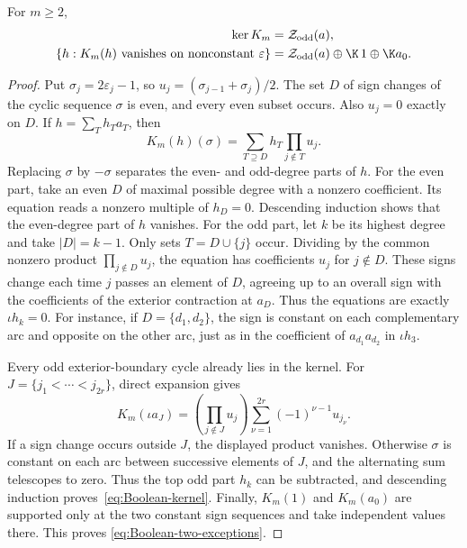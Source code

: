 \begin{lemma}\label{lem:Boolean-closing-kernel}
For $m\ge2$,
\begin{align}
\ker K_m&=\mathcal Z_{\rm odd}(a),\label{eq:Boolean-kernel}\\
\{h:K_m(h)\text{ vanishes on nonconstant }\varepsilon\}
 &=\mathcal Z_{\rm odd}(a)\oplus\K\,1\oplus\K a_0.
\label{eq:Boolean-two-exceptions}
\end{align}
\end{lemma}
\begin{proof}
Put $\sigma_j=2\varepsilon_j-1$, so $u_j=(\sigma_{j-1}+\sigma_j)/2$. The set $D$ of sign changes
of the cyclic sequence $\sigma$ is even, and every even subset occurs.
Also $u_j=0$ exactly on $D$. If $h=\sum_T h_Ta_T$, then
\[
K_m(h)(\sigma)=\sum_{T\supseteq D}h_T\prod_{j\notin T}u_j.
\]
Replacing $\sigma$ by $-\sigma$ separates the even- and odd-degree
parts of $h$. For the even part, take an even $D$ of maximal possible
degree with a nonzero coefficient. Its equation reads a nonzero multiple
of $h_D=0$. Descending induction shows that the even-degree part of
$h$ vanishes.
For the odd part, let $k$ be its highest degree and take $|D|=k-1$.
Only sets $T=D\cup\{j\}$ occur. Dividing by the common nonzero
product $\prod_{j\notin D}u_j$, the equation has coefficients $u_j$
for $j\notin D$. These signs change each time $j$ passes an element of
$D$, agreeing up to an overall sign with the coefficients of the
exterior contraction at $a_D$. Thus the equations are exactly
$\iota h_k=0$. For instance, if $D=\{d_1,d_2\}$, the sign is constant
on each complementary arc and opposite on the other arc, just as in
the coefficient of $a_{d_1}a_{d_2}$ in $\iota h_3$.

Every odd exterior-boundary cycle already lies in the kernel.
For $J=\{j_1<\cdots<j_{2r}\}$, direct expansion gives
\[
K_m(\iota a_J)
=\left(\prod_{j\notin J}u_j\right)
  \sum_{\nu=1}^{2r}(-1)^{\nu-1}u_{j_\nu}.
\]
If a sign change occurs outside $J$, the displayed product vanishes.
Otherwise $\sigma$ is
constant on each arc between successive elements of $J$, and the
alternating sum telescopes to zero. Thus the top odd part $h_k$ can be
subtracted, and descending induction proves~\eqref{eq:Boolean-kernel}.
Finally, $K_m(1)$ and $K_m(a_0)$ are supported only at the two constant
sign sequences and take independent values there. This proves
\eqref{eq:Boolean-two-exceptions}.
\end{proof}

